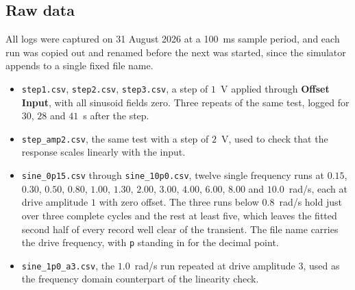 \subsection{Raw data}

All logs were captured on 31 August 2026 at a 100~ms sample period, and each run was copied
out and renamed before the next was started, since the simulator appends to a single fixed
file name.

\begin{itemize}
    \item \texttt{step1.csv}, \texttt{step2.csv}, \texttt{step3.csv}, a step of $1$~V applied
          through \textbf{Offset Input}, with all sinusoid fields zero. Three repeats of the
          same test, logged for $30$, $28$ and $41$~s after the step.
    \item \texttt{step\_amp2.csv}, the same test with a step of $2$~V, used to check that the
          response scales linearly with the input.
    \item \texttt{sine\_0p15.csv} through \texttt{sine\_10p0.csv}, twelve single frequency
          runs at $0.15$, $0.30$, $0.50$, $0.80$, $1.00$, $1.30$, $2.00$, $3.00$, $4.00$,
          $6.00$, $8.00$ and $10.0$~rad/s, each at drive amplitude $1$ with zero offset. The
          three runs below $0.8$~rad/s hold just over three complete cycles and the rest at
          least five, which leaves the fitted second half of every record well clear of the
          transient. The file name carries the drive frequency, with \texttt{p} standing in
          for the decimal point.
    \item \texttt{sine\_1p0\_a3.csv}, the $1.0$~rad/s run repeated at drive amplitude $3$,
          used as the frequency domain counterpart of the linearity check.
\end{itemize}
